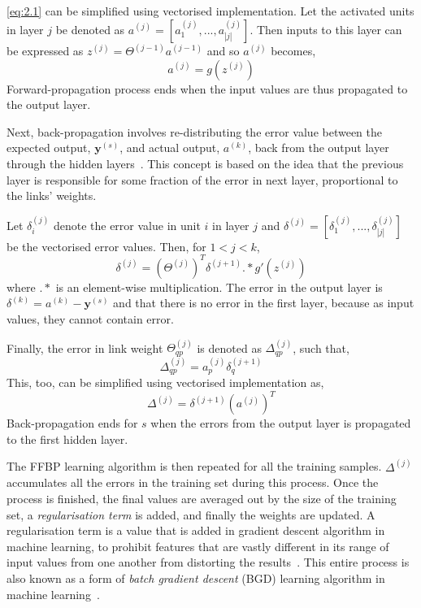 \ref{eq:2.1} can be simplified using vectorised implementation. Let the activated units in layer $j$ be denoted as $a^{(j)} = [a_{1}^{(j)},...,a_{|j|}^{(j)}]$. Then inputs to this layer can be expressed as $z^{(j)} = \Theta^{(j-1)} a^{(j-1)}$ and so $a^{(j)}$ becomes,
\begin{equation}
a^{(j)} = g(z^{(j)}) \label{eq:2.2}
\end{equation}
Forward-propagation process ends when the input values are thus propagated to the output layer. 

Next, back-propagation involves re-distributing the error value between the expected output, $\boldsymbol{y}^{(s)}$, and actual output, $a^{(k)}$, back from the output layer through the hidden layers~\cite{RumHinWil86}. This concept is based on the idea that the previous layer is responsible for some fraction of the error in next layer, proportional to the links' weights. 

Let $\delta_i^{(j)}$ denote the error value in unit $i$ in layer $j$ and $\delta^{(j)} = [\delta_1^{(j)},...,\delta_{|j|}^{(j)}]$ be the vectorised error values. Then, for $1 < j < k$,
\begin{equation}
\delta^{(j)} = (\Theta^{(j)})^{T} \delta^{(j+1)} .\!* g'(z^{(j)})
\end{equation}
where $.\!*$ is an element-wise multiplication. The error in the output layer is $\delta^{(k)} = a^{(k)} - \boldsymbol{y}^{(s)}$ and that there is no error in the first layer, because as input values, they cannot contain error.

Finally, the error in link weight $\Theta_{qp}^{(j)}$ is denoted as $\Delta_{qp}^{(j)}$, such that,
$$\Delta_{qp}^{(j)}  = a_p^{(j)}\delta_q^{(j+1)}$$
This, too, can be simplified using vectorised implementation as,
\begin{equation}
\Delta^{(j)} = \delta^{(j+1)}(a^{(j)})^T \label{eq:2.3}
\end{equation}
Back-propagation ends for $s$ when the errors from the output layer is propagated to the first hidden layer.

The FFBP learning algorithm is then repeated for all the training samples. $\Delta^{(j)}$ accumulates all the errors in the training set during this process. Once the process is finished, the final values are averaged out by the size of the training set, a \textit{regularisation term} is added, and finally the weights are updated. A regularisation term is a value that is added in gradient descent algorithm in machine learning, to prohibit features that are vastly different in its range of input values from one another from distorting the results~\cite{Ng12}. This entire process is also known as a form of \textit{batch gradient descent} (BGD) learning algorithm in machine learning~\cite{Ng12}.

